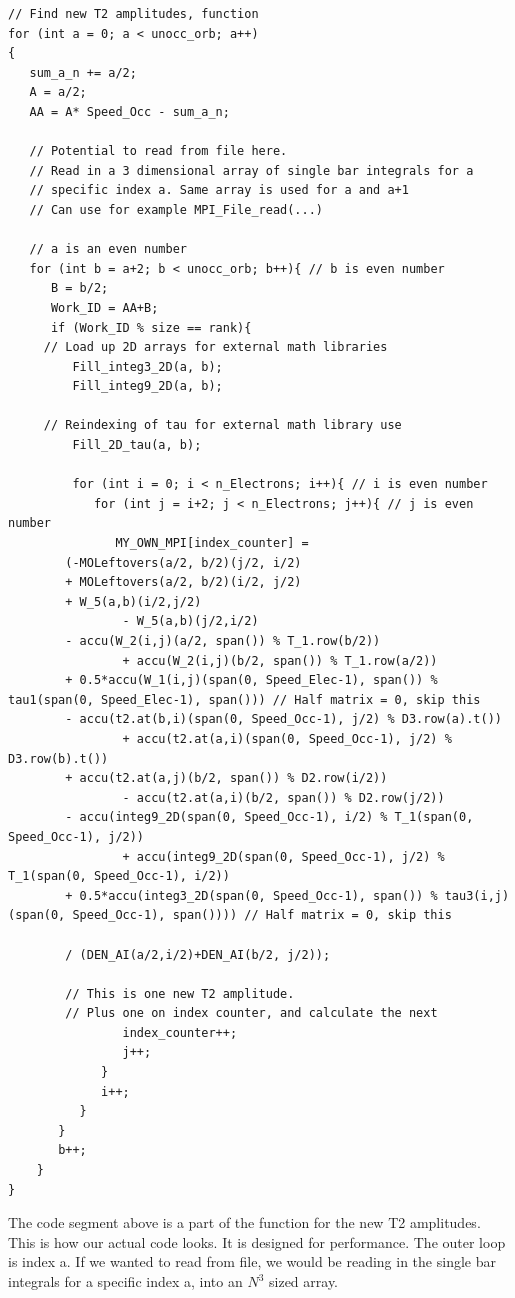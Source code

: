 \documentclass[a4paper,norsk,11pt,twoside]{report}
\begin{document}
\begin{lstlisting}
// Find new T2 amplitudes, function
for (int a = 0; a < unocc_orb; a++)
{
   sum_a_n += a/2;
   A = a/2;
   AA = A* Speed_Occ - sum_a_n;

   // Potential to read from file here.
   // Read in a 3 dimensional array of single bar integrals for a
   // specific index a. Same array is used for a and a+1
   // Can use for example MPI_File_read(...)

   // a is an even number
   for (int b = a+2; b < unocc_orb; b++){ // b is even number
      B = b/2;
      Work_ID = AA+B;
      if (Work_ID % size == rank){
     // Load up 2D arrays for external math libraries
         Fill_integ3_2D(a, b);
         Fill_integ9_2D(a, b);

     // Reindexing of tau for external math library use
         Fill_2D_tau(a, b);

         for (int i = 0; i < n_Electrons; i++){ // i is even number
            for (int j = i+2; j < n_Electrons; j++){ // j is even number
               MY_OWN_MPI[index_counter] =
        (-MOLeftovers(a/2, b/2)(j/2, i/2)
        + MOLeftovers(a/2, b/2)(i/2, j/2)
        + W_5(a,b)(i/2,j/2)
                - W_5(a,b)(j/2,i/2)
        - accu(W_2(i,j)(a/2, span()) % T_1.row(b/2))
                + accu(W_2(i,j)(b/2, span()) % T_1.row(a/2))
        + 0.5*accu(W_1(i,j)(span(0, Speed_Elec-1), span()) % tau1(span(0, Speed_Elec-1), span())) // Half matrix = 0, skip this
        - accu(t2.at(b,i)(span(0, Speed_Occ-1), j/2) % D3.row(a).t())
                + accu(t2.at(a,i)(span(0, Speed_Occ-1), j/2) % D3.row(b).t())
        + accu(t2.at(a,j)(b/2, span()) % D2.row(i/2))
                - accu(t2.at(a,i)(b/2, span()) % D2.row(j/2))
        - accu(integ9_2D(span(0, Speed_Occ-1), i/2) % T_1(span(0, Speed_Occ-1), j/2))
                + accu(integ9_2D(span(0, Speed_Occ-1), j/2) % T_1(span(0, Speed_Occ-1), i/2))
        + 0.5*accu(integ3_2D(span(0, Speed_Occ-1), span()) % tau3(i,j)(span(0, Speed_Occ-1), span()))) // Half matrix = 0, skip this
        
        / (DEN_AI(a/2,i/2)+DEN_AI(b/2, j/2));

        // This is one new T2 amplitude.
        // Plus one on index counter, and calculate the next
                index_counter++;
                j++;
             }
             i++;
          }
       }
       b++;
    }
}
\end{lstlisting}

The code segment above is a part of the function for the new T2 amplitudes. This is how our actual code looks. It is designed for performance. The outer loop is index a. If we wanted to read from file, we would be reading in the single bar integrals for a specific index a, into an $N^3$ sized array. \\
\end{document}
